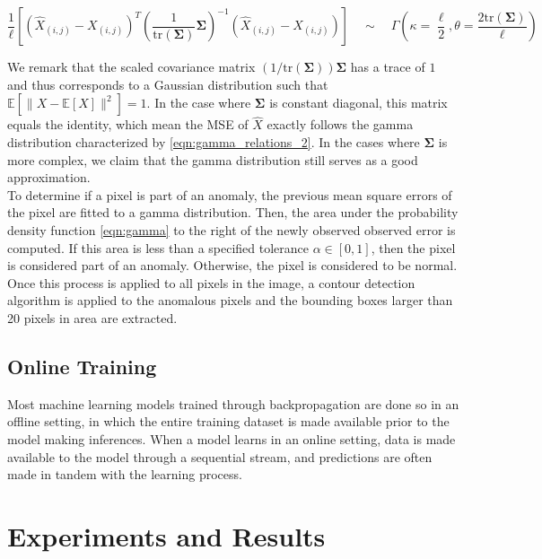 \documentclass[12pt]{article}
\begin{document}
\begin{equation}
\frac{1}{\ell}\left[(\hat{X}_{(i,j)} - X_{(i,j)})^T\left(\frac{1}{\text{tr}(\mathbf{\Sigma})}\mathbf{\Sigma}\right)^{-1}(\hat{X}_{(i,j)} - X_{(i,j)})\right] \quad \sim\quad \Gamma\left(\kappa = \frac{\ell}{2}, \theta = \frac{2\text{tr}(\mathbf{\Sigma})}{\ell}\right)
\label{eqn:gamma_relations_2} 
\end{equation}

We remark that the scaled covariance matrix $(1/\text{tr}(\mathbf{\Sigma}))\mathbf{\Sigma}$ has a trace of $1$ and thus corresponds to a Gaussian distribution such that $\mathbb{E}[\lVert X - \mathbb{E}[X] \rVert^2] = 1$. In the case where $\mathbf{\Sigma}$ is constant diagonal, this matrix equals the identity, which mean the MSE of $\hat{X}$ exactly follows the gamma distribution characterized by \eqref{eqn:gamma_relations_2}. In the cases where $\mathbf{\Sigma}$ is more complex, we claim that the gamma distribution still serves as a good approximation.\\

To determine if a pixel is part of an anomaly, the previous mean square errors of the pixel are fitted to a gamma distribution. Then, the area under the probability density function \eqref{eqn:gamma} to the right of the newly observed observed error is computed. If this area is less than a specified tolerance $\alpha \in [0,1]$, then the pixel is considered part of an anomaly. Otherwise, the pixel is considered to be normal. Once this process is applied to all pixels in the image, a contour detection algorithm is applied to the anomalous pixels and the bounding boxes larger than 20 pixels in area are extracted.

\subsection{Online Training}

Most machine learning models trained through backpropagation are done so in an offline setting, in which the entire training dataset is made available prior to the model making inferences. When a model learns in an online setting, data is made available to the model through a sequential stream, and predictions are often made in tandem with the learning process.

\section{Experiments and Results}
\end{document}
